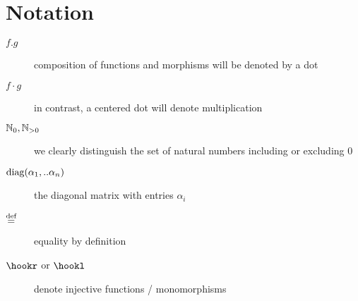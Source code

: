 \section*{Notation}

\begin{description}
\item[$f.g$] composition of functions and morphisms will be denoted by a dot
\item[$f\cdot g$] in contrast, a centered dot will denote multiplication
\item[$\operatorname{\mathbb N_0}, \operatorname{\mathbb N_{>0}}$] we clearly distinguish the set of natural numbers including or excluding 0
\item[$\operatorname{\text{diag}}(\alpha_1,..\alpha_n)$] the diagonal matrix with entries $\alpha_i$
\item[$\operatorname{\overset{\text{def}}=}$] equality by definition
\item[$\hookr$ or $\hookl$] denote injective functions / monomorphisms
\end{description}
